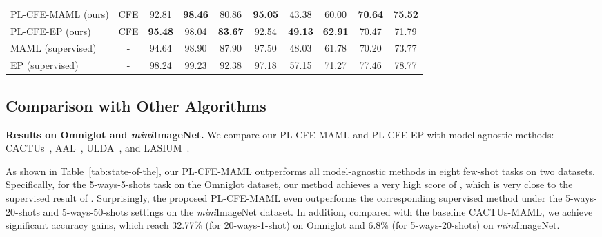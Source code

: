 \documentclass[runningheads]{llncs}
\def\ourmodel{PL-CFE}
\begin{document}
\begin{table*}[!tb]
{\begin{tabular}{lccccc|cccc}
			\ourmodel-MAML (ours)      & CFE        & 92.81 & \bf 98.46 & 80.86  & \bf 95.05  & 43.38  & 60.00  & \bf 70.64  & \bf 75.52  \\
			\ourmodel-EP (ours)       & CFE        & \bf 95.48 & 98.04 & \bf 83.67  & 92.54  & \bf 49.13  & \bf 62.91  & 70.47  & 71.79  \\
			\hline
			MAML (supervised)       & -        & 94.64 & 98.90 & 87.90  & 97.50  & 48.03  & 61.78  & 70.20  & 73.77  \\
			EP (supervised)         & -        & 98.24 & 99.23 & 92.38  & 97.18  & 57.15  & 71.27  & 77.46  & 78.77 \\
			\hline
		\end{tabular}
	}
	\small\caption{\textbf{Accuracy (\%) of N-ways-K-shots (N,K) tasks.} A/D represents ACAI~\cite{berthelot2018understanding} on Omniglot~\cite{lake2011one} and DC~\cite{caron2018deep} on \textit{mini}ImageNet~\cite{ravi2016optimization}. The best values are in bold. \vspace{-2mm}
	}
	\label{tab:state-of-the}
	\vspace{-2mm}
\end{table*}

\subsection{Comparison with Other Algorithms}


\noindent\textbf{Results on Omniglot and \textit{mini}ImageNet.}
We compare our \ourmodel-MAML and \ourmodel-EP with model-agnostic methods: CACTUs~\cite{hsu2018unsupervised}, AAL~\cite{antoniou2019assume},   ULDA~\cite{qin2020unsupervised}, and LASIUM~\cite{khodadadeh2020unsupervised}.




As shown in Table~\ref{tab:state-of-the}, our \ourmodel-MAML outperforms all model-agnostic methods in eight few-shot tasks on two datasets. 
Specifically, for the 5-ways-5-shots task on the Omniglot dataset, our method achieves a very high score of , which is very close to the supervised result of . Surprisingly, the proposed \ourmodel-MAML even outperforms the corresponding supervised method under the 5-ways-20-shots and 5-ways-50-shots settings on the \textit{mini}ImageNet dataset. In addition, compared with the baseline CACTUs-MAML, we achieve significant accuracy gains, which reach 32.77\% (for 20-ways-1-shot) on Omniglot and 6.8\% (for 5-ways-20-shots) on \textit{mini}ImageNet. 
\end{document}

